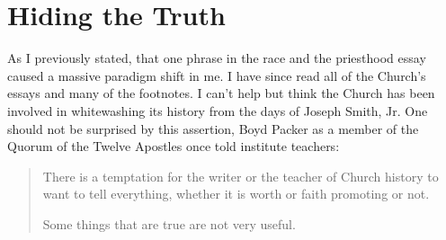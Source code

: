 \documentclass[a4paper]{article}
\begin{document}
\section{Hiding the Truth%
  \label{hiding-the-truth}%
}

As I previously stated, that one phrase in the race and the priesthood essay caused a massive paradigm shift in me.  I have since read all of the Church's essays and many of the footnotes.  I can't help but think the Church has been involved in whitewashing its history from the days of Joseph Smith, Jr.  One should not be surprised by this assertion, Boyd Packer as a member of the Quorum of the Twelve Apostles once told institute teachers:
%
\begin{quote}

There is a temptation for the writer or the teacher of Church history to want to tell everything, whether it is worth or faith promoting or not.

Some things that are true are not very useful.

\end{quote}
\end{document}
